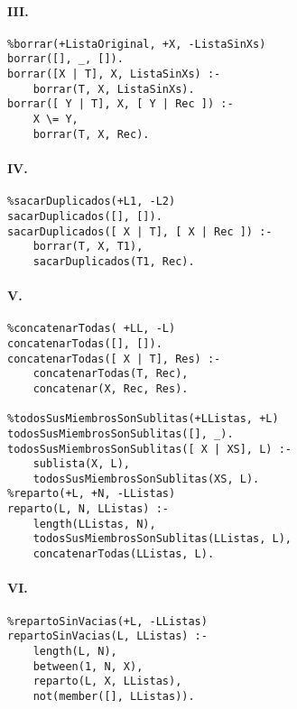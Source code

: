 \documentclass[10pt,a4paper]{article}
\begin{document}
\paragraph{III.}
\begin{centrado}
\begin{verbatim}
%borrar(+ListaOriginal, +X, -ListaSinXs)
borrar([], _, []).
borrar([X | T], X, ListaSinXs) :-
	borrar(T, X, ListaSinXs).
borrar([ Y | T], X, [ Y | Rec ]) :-
	X \= Y,
	borrar(T, X, Rec).
\end{verbatim}
\end{centrado}
\paragraph{IV.}
\begin{centrado}
\begin{verbatim}
%sacarDuplicados(+L1, -L2)
sacarDuplicados([], []).
sacarDuplicados([ X | T], [ X | Rec ]) :-
	borrar(T, X, T1),
	sacarDuplicados(T1, Rec).
\end{verbatim}
\end{centrado}
\newpage
\paragraph{V.}
\begin{centrado}
\begin{verbatim}
%concatenarTodas( +LL, -L)
concatenarTodas([], []).
concatenarTodas([ X | T], Res) :-
	concatenarTodas(T, Rec),
	concatenar(X, Rec, Res).

%todosSusMiembrosSonSublitas(+LListas, +L)
todosSusMiembrosSonSublitas([], _).
todosSusMiembrosSonSublitas([ X | XS], L) :-
	sublista(X, L),
	todosSusMiembrosSonSublitas(XS, L).
%reparto(+L, +N, -LListas)
reparto(L, N, LListas) :-
	length(LListas, N),
	todosSusMiembrosSonSublitas(LListas, L),
	concatenarTodas(LListas, L).
\end{verbatim}
\end{centrado}

\paragraph{VI.}
\begin{centrado}
\begin{verbatim}
%repartoSinVacias(+L, -LListas)
repartoSinVacias(L, LListas) :-
	length(L, N),
	between(1, N, X),
	reparto(L, X, LListas),
	not(member([], LListas)).
\end{verbatim}
\end{centrado}
\end{document}

